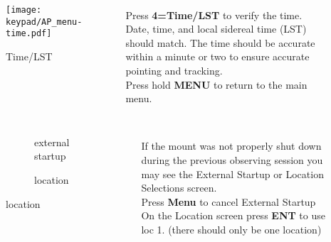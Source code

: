 \begin{frame}[t]{\insertsubsectionhead}
    \begin{columns}[T]
      \begin{figure}[h]
          \texttt{[image: keypad/AP\_menu-time.pdf]}
        \caption{Time/LST}
      \end{figure}
    \ \\[0.25ex]
    Press \textbf{4=Time/LST} to verify the time.\\[1ex]

    Date, time, and local sidereal time (LST) should match. The time should be
    accurate within a minute or two to ensure accurate pointing and tracking.\\[1ex]

    Press hold \textbf{MENU} to return to the main menu.
  \end{columns}
\end{frame}

\begin{frame}[t]{\insertsubsectionhead}
    \begin{columns}[T]
    \begin{figure}[ht]
      \begin{subfigure}{0.67\textwidth}
      \caption{external startup}
    \end{subfigure}
    \vspace{\fill}
    \begin{subfigure}{0.67\textwidth}
      \caption{location}
    \end{subfigure}
  \end{figure}
    \ \\[0.25ex]
    If the mount was not properly shut down during the previous observing
    session you may see the External Startup or Location Selections screen.\\[1ex]

    Press \textbf{Menu} to cancel External Startup\\[1ex]

    On the Location screen press \textbf{ENT} to use loc 1.
    (there should only be one location)

  \end{columns}
\end{frame}

